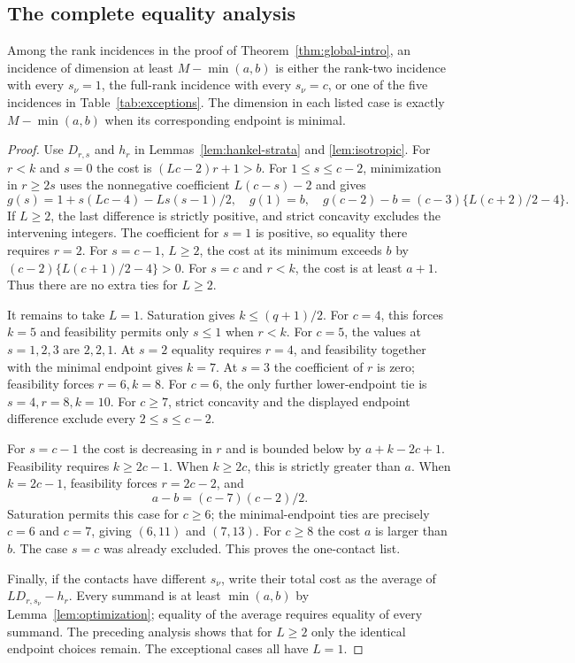 \subsection{The complete equality analysis}
\begin{lemma}\label{lem:all-ties}
Among the rank incidences in the proof of
Theorem~\ref{thm:global-intro}, an incidence of dimension at least
$M-\min(a,b)$ is either the rank-two incidence with every $s_\nu=1$,
the full-rank incidence with every $s_\nu=c$, or one of the five
incidences in Table~\ref{tab:exceptions}. The dimension in each listed
case is exactly $M-\min(a,b)$ when its corresponding endpoint is minimal.
\end{lemma}
\begin{proof}

Use $D_{r,s}$ and $h_r$ in Lemmas~\ref{lem:hankel-strata} and
\ref{lem:isotropic}. For $r<k$ and $s=0$ the cost is
$(Lc-2)r+1>b$. For $1\le s\le c-2$, minimization in $r\ge2s$
uses the nonnegative coefficient $L(c-s)-2$ and gives
\[
 g(s)=1+s(Lc-4)-Ls(s-1)/2,
 \quad g(1)=b,
 \quad g(c-2)-b=(c-3)\{L(c+2)/2-4\}.
\]
If $L\ge2$, the last difference is strictly positive, and strict
concavity excludes the intervening integers. The coefficient for $s=1$
is positive, so equality there requires $r=2$.
For $s=c-1$, $L\ge2$, the cost at its minimum exceeds $b$ by
$(c-2)\{L(c+1)/2-4\}>0$. For $s=c$ and $r<k$, the cost is at
least $a+1$. Thus there are no extra ties for $L\ge2$.

It remains to take $L=1$. Saturation gives $k\le(q+1)/2$.
For $c=4$, this forces $k=5$ and feasibility permits only $s\le1$
when $r<k$. For $c=5$, the values at $s=1,2,3$ are $2,2,1$.
At $s=2$ equality requires $r=4$, and feasibility together with the
minimal endpoint gives $k=7$. At $s=3$ the coefficient of $r$ is zero;
feasibility forces $r=6,k=8$. For $c=6$, the only further lower-endpoint
tie is $s=4,r=8,k=10$.
For $c\ge7$, strict concavity and the displayed endpoint difference
exclude every $2\le s\le c-2$.

For $s=c-1$ the cost is decreasing in $r$ and is bounded below by
$a+k-2c+1$. Feasibility requires $k\ge2c-1$.
When $k\ge2c$, this is strictly greater than $a$.
When $k=2c-1$, feasibility forces $r=2c-2$, and
\[
 a-b=(c-7)(c-2)/2.
\]
Saturation permits this case for $c\ge6$; the minimal-endpoint ties
are precisely $c=6$ and $c=7$, giving $(6,11)$ and $(7,13)$.
For $c\ge8$ the cost $a$ is larger than $b$. The case $s=c$ was
already excluded. This proves the one-contact list.

Finally, if the contacts have different $s_\nu$, write their total cost
as the average of $LD_{r,s_\nu}-h_r$. Every summand is at least
$\min(a,b)$ by Lemma~\ref{lem:optimization}; equality of the average
requires equality of every summand. The preceding analysis shows that
for $L\ge2$ only the identical endpoint choices remain. The exceptional
cases all have $L=1$.
\end{proof}

